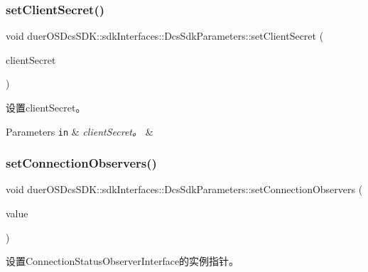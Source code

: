 \subsubsection{\texorpdfstring{set\+Client\+Secret()}{setClientSecret()}}
{\footnotesize\ttfamily void duer\+O\+S\+Dcs\+S\+D\+K\+::sdk\+Interfaces\+::\+Dcs\+Sdk\+Parameters\+::set\+Client\+Secret (\begin{DoxyParamCaption}\item[{const std\+::string}]{client\+Secret }\end{DoxyParamCaption})\hspace{0.3cm}{\ttfamily [inline]}}



设置client\+Secret。 


\begin{DoxyParams}[1]{Parameters}
\mbox{\tt in}  & {\em client\+Secret。} & \\
\hline
\end{DoxyParams}
\mbox{\label{structduerOSDcsSDK_1_1sdkInterfaces_1_1DcsSdkParameters_a82391d394920edd2cdce280c111021b4}} 
\subsubsection{\texorpdfstring{set\+Connection\+Observers()}{setConnectionObservers()}}
{\footnotesize\ttfamily void duer\+O\+S\+Dcs\+S\+D\+K\+::sdk\+Interfaces\+::\+Dcs\+Sdk\+Parameters\+::set\+Connection\+Observers (\begin{DoxyParamCaption}\item[{std\+::shared\+\_\+ptr$<$ \hyperlink{classduerOSDcsSDK_1_1sdkInterfaces_1_1ConnectionStatusObserverInterface}{sdk\+Interfaces\+::\+Connection\+Status\+Observer\+Interface} $>$}]{value }\end{DoxyParamCaption})\hspace{0.3cm}{\ttfamily [inline]}}



设置\+Connection\+Status\+Observer\+Interface的实例指针。 



